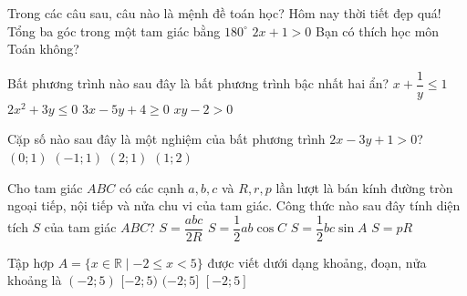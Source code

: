 \begin{ex}
	Trong các câu sau, câu nào là mệnh đề toán học?
	\choice
{Hôm nay thời tiết đẹp quá!}
{\True Tổng ba góc trong một tam giác bằng $180^\circ$}
{$2x + 1 > 0$}
{Bạn có thích học môn Toán không?}
\end{ex}

\begin{ex}
	Bất phương trình nào sau đây là bất phương trình bậc nhất hai ẩn?
	\choice
{$x + \dfrac{1}{y} \le 1$}
{$2x^2 + 3y \le 0$}
{\True $3x - 5y + 4 \ge 0$}
{$xy - 2 > 0$}
\end{ex}

\begin{ex}
	Cặp số nào sau đây là một nghiệm của bất phương trình $2x - 3y + 1 > 0$?
	\choice
{$(0; 1)$}
{$(-1; 1)$}
{\True $(2; 1)$}
{$(1; 2)$}
\end{ex}

\begin{ex}
	Cho tam giác $ABC$ có các cạnh $a, b, c$ và $R, r, p$ lần lượt là bán kính đường tròn ngoại tiếp, nội tiếp và nửa chu vi của tam giác. Công thức nào sau đây tính diện tích $S$ của tam giác $ABC$?
	\choice
{$S = \dfrac{abc}{2R}$}
{$S = \dfrac{1}{2}ab \cos C$}
{\True $S = \dfrac{1}{2}bc \sin A$}
{$S = pR$}
\end{ex}

\begin{ex}
	Tập hợp $A = \{x \in \mathbb{R} \mid -2 \le x < 5\}$ được viết dưới dạng khoảng, đoạn, nửa khoảng là
	\choice
{$(-2; 5)$}
{\True $[-2; 5)$}
{$(-2; 5]$}
{$[-2; 5]$}
\loigiai{
		Tập hợp các số thực thoả mãn $-2 \le x < 5$ là nửa khoảng $[-2; 5)$.
	}
\end{ex}

